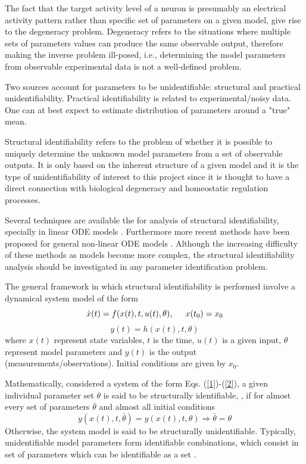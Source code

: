 The fact that the target activity level of a neuron is presumably an electrical activity pattern rather than specific set of parameters on a given model, give rise to the degeneracy problem. Degeneracy refers to the situations where multiple sets of parameters values can produce the same observable output, therefore making the inverse problem ill-posed, i.e., determining the model parameters from observable experimental data is not a well-defined problem.

Two sources account for parameters to be unidentifiable: structural and practical unidentifiability. Practical identifiability is related to experimental/noisy data. One can at best expect to estimate distribution of parameters around a "true" mean. 

Structural identifiability refers to the problem of whether it is possible to uniquely determine the unknown model parameters from a set of observable outputs. It is only based on the inherent structure of a given model and it is the type of unidentifiability of interest to this project since it is thought to have a direct connection with biological degeneracy and homeostatic regulation processes.

Several techniques are available the for analysis of structural identifiability, specially in linear ODE models \cite{GODFREY198589}. Furthermore more recent methods have been proposed for general non-linear ODE models \cite{sc2}. Although the increasing difficulty of these methods as models become more complex, the structural identifiability analysis should be investigated in any parameter identification problem. 

The general framework in which structural identifiability is performed involve a dynamical system model of the form
\begin{equation}
    \dot{x}(t) = f(x(t),t,u(t),\theta), \hspace{0.5cm} x(t_{0})=x_{0}
    \label{1}
\end{equation}
\begin{equation}
    y(t) = h(x(t),t,\theta)
    \label{2}
\end{equation}
where $x(t)$ represent state variables, $t$ is the time, $u(t)$ is a given input, $\theta$ represent model parameters and $y(t)$ is the output (measurements/observations). Initial conditions are given by $x_{0}$.

Mathematically, considered a system of the form Eqs. (\ref{1})-(\ref{2}), a given individual parameter set $\theta$ is said to be structurally identifiable, \cite{Eisenberg2014}, if for almost every set of parameters $\bar{\theta}$ and almost all initial conditions
\begin{equation}
    y(x(t),t,\bar{\theta}) = y(x(t),t,\theta) \Longrightarrow \bar{\theta} = \theta
\end{equation}
Otherwise, the system model is said to be structurally unidentifiable. Typically, unidentifiable model parameters form identifiable combinations, which consist in set of parameters which can be identifiable as a set \cite{Eisenberg2014}.

